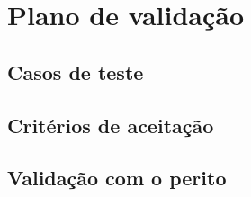\chapter{Plano de validação}
\label{cap:validacao}

\section{Casos de teste}


\section{Critérios de aceitação}


\section{Validação com o perito}


